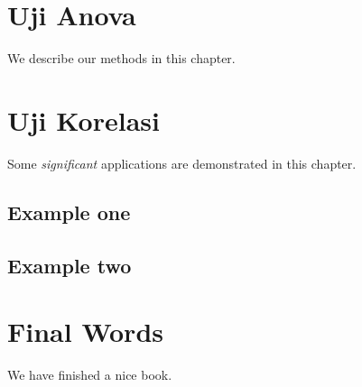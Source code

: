 \documentclass[
]{book}
\begin{document}
\hypertarget{uji-anova}{%
\chapter{Uji Anova}\label{uji-anova}}

We describe our methods in this chapter.

\hypertarget{uji-korelasi}{%
\chapter{Uji Korelasi}\label{uji-korelasi}}

Some \emph{significant} applications are demonstrated in this chapter.

\hypertarget{example-one}{%
\section{Example one}\label{example-one}}

\hypertarget{example-two}{%
\section{Example two}\label{example-two}}

\hypertarget{final-words}{%
\chapter{Final Words}\label{final-words}}

We have finished a nice book.

  
\end{document}

